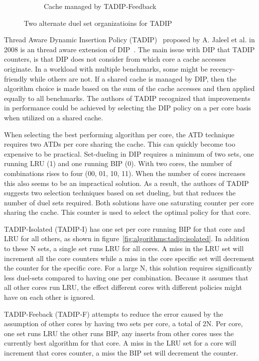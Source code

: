 \begin{figure}[H]
\begin{subfigure}[b]{0.5\textwidth}
        \caption{Cache managed by TADIP-Feedback}
        \label{fig:algorithms:tadip:feedback}
    \end{subfigure}    
    \caption{Two alternate duel set organizatioins for TADIP}
    \label{fig:algorithms:tadip}
\end{figure}

Thread Aware Dynamic Insertion Policy (TADIP)~\cite{Jaleel2008} proposed by A. Jaleel et al. in 2008 is an thread aware extension of DIP~\cite{Qureshi2007}.
The main issue with DIP that TADIP counters, is that DIP does not consider from which core a cache accesses originate.
In a workload with multiple benchmarks, some might be recency-friendly while others are not. 
If a shared cache is managed by DIP, then the algorithm choice is made based on the sum of the cache accesses and then applied equally to all benchmarks.
The authors of TADIP recognized that improvements in performance could be achieved by selecting the DIP policy on a per core basis when utilized on a shared cache.

When selecting the best performing algorithm per core, the ATD technique requires two ATDs per core sharing the cache. 
This can quickly become too expensive to be practical.
Set-dueling in DIP requires a minimum of two sets, one running LRU (1) and one running BIP (0). 
With two cores, the number of combinations rises to four (00, 01, 10, 11).
When the number of cores increases this also seems to be an impractical solution.
As a result, the authors of TADIP suggests two selection techniques based on set dueling, but that reduces the number of duel sets required.
Both solutions have one saturating counter per core sharing the cache.
This counter is used to select the optimal policy for that core.

TADIP-Isolated (TADIP-I) has one set per core running BIP for that core and LRU for all others, as shown in figure~\ref{fig:algorithms:tadip:isolated}.
In addition to these N sets, a single set runs LRU for all cores. 
A miss in the LRU set will increment all the core counters while a miss in the core specific set will decrement the counter for the specific core.
For a large N, this solution requires significantly less duel-sets compared to having one per combination. 
Because it assumes that all other cores run LRU, the effect different cores with different policies might have on each other is ignored.

TADIP-Feeback (TADIP-F) attempts to reduce the error caused by the assumption of other cores by having two sets per core, a total of 2N.
Per core, one set runs LRU the other runs BIP, any inserts from other cores uses the currently best algorithm for that core.
A miss in the LRU set for a core will increment that cores counter, a miss the BIP set will decrement the counter.

